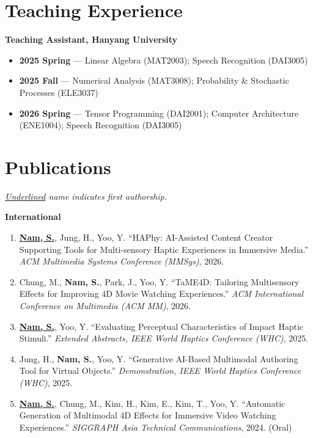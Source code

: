 \documentclass[11pt,a4paper]{article}
\newcommand{\me}{\textbf{Nam, S.}}
\begin{document}
\section{Teaching Experience}
\textbf{Teaching Assistant, Hanyang University}\par\vspace{2pt}
\begin{itemize}
  \item \textbf{2025 Spring} --- Linear Algebra (MAT2003); Speech Recognition (DAI3005)
  \item \textbf{2025 Fall} --- Numerical Analysis (MAT3008); Probability \& Stochastic Processes (ELE3037)
  \item \textbf{2026 Spring} --- Tensor Programming (DAI2001); Computer Architecture (ENE1004); Speech Recognition (DAI3005)
\end{itemize}

\section{Publications}
\textit{\color{muted}\underline{Underlined} name indicates first authorship.}\par\vspace{4pt}

\textbf{International}
\begin{enumerate}[leftmargin=1.5em, itemsep=3pt, topsep=3pt]
  \item \underline{\me}, Jung, H., Yoo, Y. ``HAPhy: AI-Assisted Content Creator Supporting Tools for Multi-sensory Haptic Experiences in Immersive Media.'' \textit{ACM Multimedia Systems Conference (MMSys)}, 2026.
  \item Chung, M., \me, Park, J., Yoo, Y. ``TaME4D: Tailoring Multisensory Effects for Improving 4D Movie Watching Experiences.'' \textit{ACM International Conference on Multimedia (ACM MM)}, 2026.
  \item \underline{\me}, Yoo, Y. ``Evaluating Perceptual Characteristics of Impact Haptic Stimuli.'' \textit{Extended Abstracts, IEEE World Haptics Conference (WHC)}, 2025.
  \item Jung, H., \me, Yoo, Y. ``Generative AI-Based Multimodal Authoring Tool for Virtual Objects.'' \textit{Demonstration, IEEE World Haptics Conference (WHC)}, 2025.
  \item \underline{\me}, Chung, M., Kim, H., Kim, E., Kim, T., Yoo, Y. ``Automatic Generation of Multimodal 4D Effects for Immersive Video Watching Experiences.'' \textit{SIGGRAPH Asia Technical Communications}, 2024. (Oral)
\end{enumerate}
\end{document}

